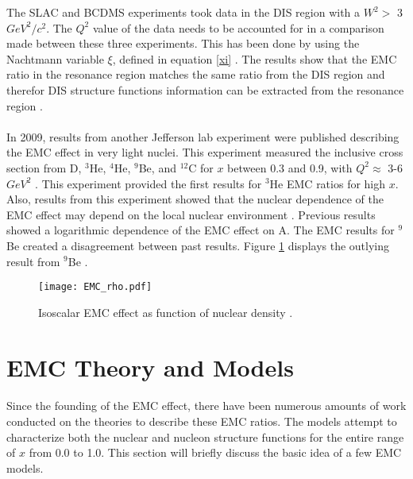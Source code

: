 The SLAC and BCDMS experiments took data in the DIS region with a $W^2 > $ 3 $GeV^2/c^2$. The $Q^2$ value of the data needs to be accounted for in a comparison made between these three experiments. This has been done by using the Nachtmann variable $\xi$, defined in equation \ref{xi} \cite{EMC_JA}. The results show that the EMC ratio in the resonance region matches the same ratio from the DIS region and therefor DIS structure functions information can be extracted from the resonance region \cite{seelyth}. 
\paragraph{}In 2009, results from another Jefferson lab experiment were published describing the EMC effect in very light nuclei. This experiment measured the inclusive cross section from D, $^3$He, $^4$He, $^9$Be, and $^{12}$C for $x$ between 0.3 and 0.9, with $Q^2 \approx$ 3-6 $GeV^2$ \cite{seeley}.  This experiment provided the first results for $^3$He EMC ratios for high $x$.  Also, results from this experiment showed that the nuclear dependence of the EMC effect may depend on the local nuclear environment \cite{seeley}. Previous results showed a logarithmic dependence of the EMC effect on A. The EMC results for $^9$Be created a disagreement between past results. Figure \ref{EMCrho}  displays the outlying result from $^9$Be \cite{seeley}.

\iffalse
\begin{figure}[h]
	\centering
	\texttt{[image: He3\_EMC\_seely.pdf]} 
	\caption{EMC ratio for He3, Blue points are corrected for proton excess\cite{seeley}.}
	\label{EMCHe3_Seely}
\end{figure} 
\fi

\begin{figure}[t]
	\centering
	\texttt{[image: EMC\_rho.pdf]} 
	\caption{Isoscalar EMC effect as function of nuclear density \cite{seeley}.}
	\label{EMCrho}
\end{figure} 

\section{EMC Theory and Models}
\paragraph{}Since the founding of the EMC effect, there have been numerous amounts of work conducted on the theories to describe these EMC ratios. The models attempt to characterize both the nuclear and nucleon structure functions for the entire range of $x$ from 0.0 to 1.0. This section will briefly discuss the basic idea of a few EMC models.
